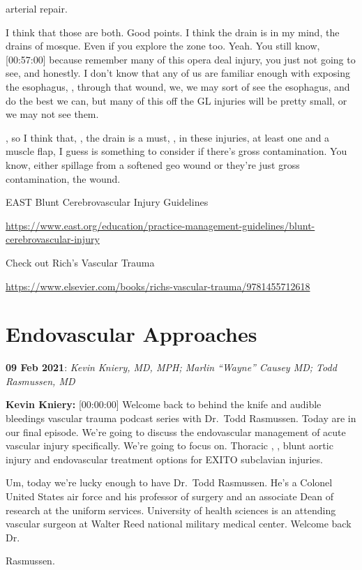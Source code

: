 \documentclass[
]{book}
\begin{document}
arterial repair.

I think that
those are both. Good points. I think the drain is in my mind, the drains
of mosque. Even if you explore the zone too. Yeah. You still know,
{[}00:57:00{]} because remember many of this opera deal injury, you just not
going to see, and honestly. I don't know that any of us are familiar
enough with exposing the esophagus, , through that wound, we, we may
sort of see the esophagus, and do the best we can, but many of this off
the GL injuries will be pretty small, or we may not see them.

, so I think that, , the drain is a must, , in these injuries, at least
one and a muscle flap, I guess is something to consider if there's gross
contamination. You know, either spillage from a softened geo wound or
they're just gross contamination, the wound.

EAST Blunt Cerebrovascular Injury Guidelines

\url{https://www.east.org/education/practice-management-guidelines/blunt-cerebrovascular-injury}

Check out Rich's Vascular Trauma

\url{https://www.elsevier.com/books/richs-vascular-trauma/9781455712618}

\hypertarget{endovascular-approaches}{%
\section{Endovascular Approaches}\label{endovascular-approaches}}

\textbf{09 Feb 2021}: \emph{Kevin Kniery, MD, MPH; Marlin ``Wayne'' Causey MD; Todd
Rasmussen, MD}

\textbf{Kevin Kniery:} {[}00:00:00{]} Welcome back to behind the knife and
audible bleedings vascular trauma podcast series with Dr.~Todd
Rasmussen. Today are in our final episode. We're going to discuss the
endovascular management of acute vascular injury specifically. We're
going to focus on. Thoracic , , blunt aortic injury and endovascular
treatment options for EXITO subclavian injuries.

Um, today we're lucky enough to have Dr.~Todd Rasmussen. He's a Colonel
United States air force and his professor of surgery and an associate
Dean of research at the uniform services. University of health sciences
is an attending vascular surgeon at Walter Reed national military
medical center. Welcome back Dr.

Rasmussen.
\end{document}
